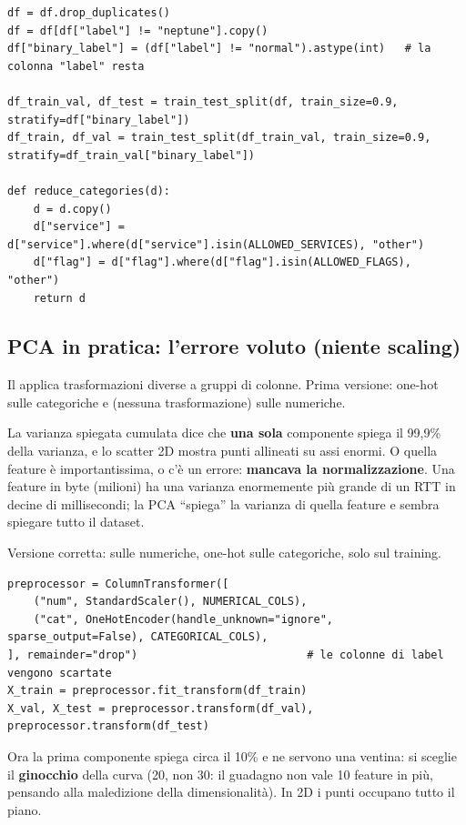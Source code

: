 \begin{lstlisting}
df = df.drop_duplicates()
df = df[df["label"] != "neptune"].copy()
df["binary_label"] = (df["label"] != "normal").astype(int)   # la colonna "label" resta

df_train_val, df_test = train_test_split(df, train_size=0.9, stratify=df["binary_label"])
df_train, df_val = train_test_split(df_train_val, train_size=0.9, stratify=df_train_val["binary_label"])

def reduce_categories(d):
    d = d.copy()
    d["service"] = d["service"].where(d["service"].isin(ALLOWED_SERVICES), "other")
    d["flag"] = d["flag"].where(d["flag"].isin(ALLOWED_FLAGS), "other")
    return d
\end{lstlisting}

\subsection{PCA in pratica: l'errore voluto (niente scaling)}
Il  applica trasformazioni diverse a gruppi di colonne. Prima versione: one-hot sulle categoriche e
 (nessuna trasformazione) sulle numeriche.

\begin{attenzione}
La varianza spiegata cumulata dice che \textbf{una sola} componente spiega il 99,9\% della varianza, e lo scatter 2D mostra punti
allineati su assi enormi. O quella feature è importantissima, o c'è un errore: \textbf{mancava la normalizzazione}. Una feature in byte
(milioni) ha una varianza enormemente più grande di un RTT in decine di millisecondi; la PCA ``spiega'' la varianza di quella feature e
sembra spiegare tutto il dataset.
\end{attenzione}

Versione corretta:  sulle numeriche, one-hot sulle categoriche,  solo sul training.
\begin{lstlisting}
preprocessor = ColumnTransformer([
    ("num", StandardScaler(), NUMERICAL_COLS),
    ("cat", OneHotEncoder(handle_unknown="ignore", sparse_output=False), CATEGORICAL_COLS),
], remainder="drop")                          # le colonne di label vengono scartate
X_train = preprocessor.fit_transform(df_train)
X_val, X_test = preprocessor.transform(df_val), preprocessor.transform(df_test)
\end{lstlisting}
Ora la prima componente spiega circa il 10\% e ne servono una ventina: si sceglie il \textbf{ginocchio} della curva (20, non 30: il
guadagno non vale 10 feature in più, pensando alla maledizione della dimensionalità). In 2D i punti occupano tutto il piano.

